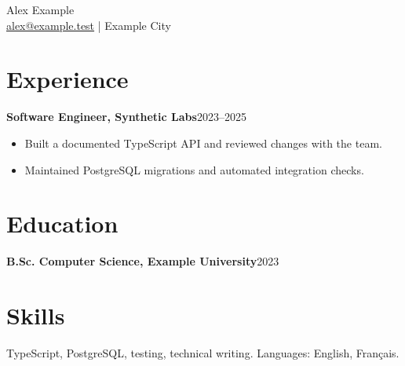 \documentclass[10pt]{article}
\newcommand{\role}[2]{\textbf{#1}\hfill #2\par}
\begin{document}
\begin{center}
{\LARGE Alex Example}\\
\href{mailto:alex@example.test}{alex@example.test} | Example City
\end{center}
\section*{Experience}
\role{Software Engineer, Synthetic Labs}{2023--2025}
\begin{itemize}[leftmargin=*]
\item Built a documented TypeScript API and reviewed changes with the team.
\item Maintained PostgreSQL migrations and automated integration checks.
\end{itemize}
\section*{Education}
\role{B.Sc. Computer Science, Example University}{2023}
\section*{Skills}
TypeScript, PostgreSQL, testing, technical writing. Languages: English, Fran\c{c}ais.
\end{document}
